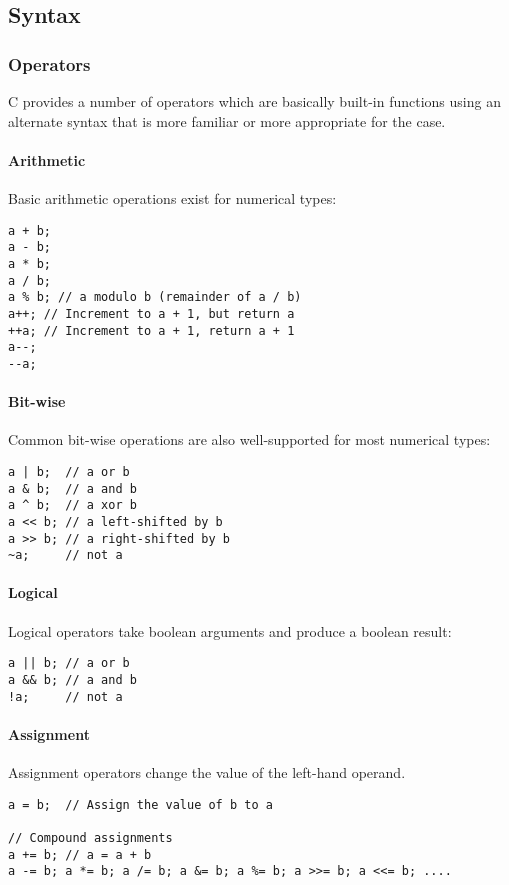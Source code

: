 \documentclass[10pt]{article}
\begin{document}
\subsection{Syntax}
\subsubsection{Operators}
C provides a number of operators which are basically built-in functions using an alternate syntax that is more familiar or more appropriate for the case.
\paragraph{Arithmetic}
Basic arithmetic operations exist for numerical types:
\begin{lstlisting}[]
a + b;
a - b;
a * b;
a / b;
a % b; // a modulo b (remainder of a / b)
a++; // Increment to a + 1, but return a
++a; // Increment to a + 1, return a + 1
a--;
--a;
\end{lstlisting}

\paragraph{Bit-wise}
Common bit-wise operations are also well-supported for most numerical types:
\begin{lstlisting}[]
a | b;  // a or b
a & b;  // a and b
a ^ b;  // a xor b
a << b; // a left-shifted by b
a >> b; // a right-shifted by b
~a;     // not a
\end{lstlisting}

\paragraph{Logical}
Logical operators take boolean arguments and produce a boolean result:
\begin{lstlisting}
a || b; // a or b
a && b; // a and b
!a;     // not a
\end{lstlisting}

\paragraph{Assignment}
Assignment operators change the value of the left-hand operand.
\begin{lstlisting}[]
a = b;  // Assign the value of b to a

// Compound assignments
a += b; // a = a + b
a -= b; a *= b; a /= b; a &= b; a %= b; a >>= b; a <<= b; ....
\end{lstlisting}
\end{document}
